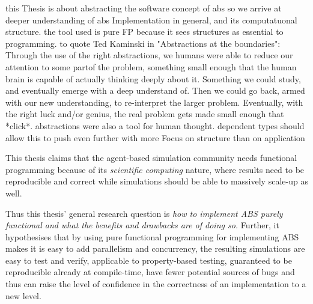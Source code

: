 this Thesis is about abstracting the software concept of abs so we arrive at deeper understanding of abs Implementation in general, and its computatuonal structure. the tool used is pure FP because it sees structures as essential to programming. to quote Ted Kaminski in "Abstractions at the boundaries": Through the use of the right abstractions, we humans were able to reduce our attention to some partof the problem, something small enough that the human brain is capable of actually thinking deeply about it. Something we could study, and eventually emerge with a deep understand of. Then we could go back, armed with our new understanding, to re-interpret the larger problem. Eventually, with the right luck and/or genius, the real problem gets made small enough that *click*. abstractions were also a tool for human thought.
dependent types should allow this to push even further with more Focus on structure than on application

This thesis claims that the agent-based simulation community needs functional programming because of its \textit{scientific computing} nature, where results need to be reproducible and correct while simulations should be able to massively scale-up as well. %

Thus this thesis' general research question is \textit{how to implement ABS purely functional and what the benefits and drawbacks are of doing so.} Further, it hypothesises that by using pure functional programming for implementing ABS makes it is easy to add parallelism and concurrency, the resulting simulations are easy to test and verify, applicable to property-based testing, guaranteed to be reproducible already at compile-time, have fewer potential sources of bugs and thus can raise the level of confidence in the correctness of an implementation to a new level.

\newpage

